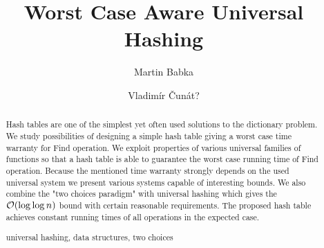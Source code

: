 \documentclass[runningheads,a4paper]{llncs}
\newcommand{\keywords}[1]{\par\addvspace\baselineskip
\noindent\keywordname\enspace\ignorespaces#1}
\begin{document}
\mainmatter

\author{Martin Babka
\and Vladimír Čunát?}

\title{Worst Case Aware Universal Hashing}



\maketitle

\begin{abstract}
Hash tables are one of the simplest yet often used solutions to the dictionary problem. 
We study possibilities of designing a simple hash table giving a worst case time warranty for Find operation.
We exploit properties of various universal families of functions so that a hash table is able to guarantee the worst case running time of Find operation.
Because the mentioned time warranty strongly depends on the used universal system we present various systems capable of interesting bounds.
We also combine the "two choices paradigm" with universal hashing which gives the $\mathcal{O}(\log \log n)$ bound with certain reasonable requirements.
The proposed hash table achieves constant running times of all operations in the expected case.

\keywords{universal hashing, data structures, two choices}
\end{abstract}








\end{document}
